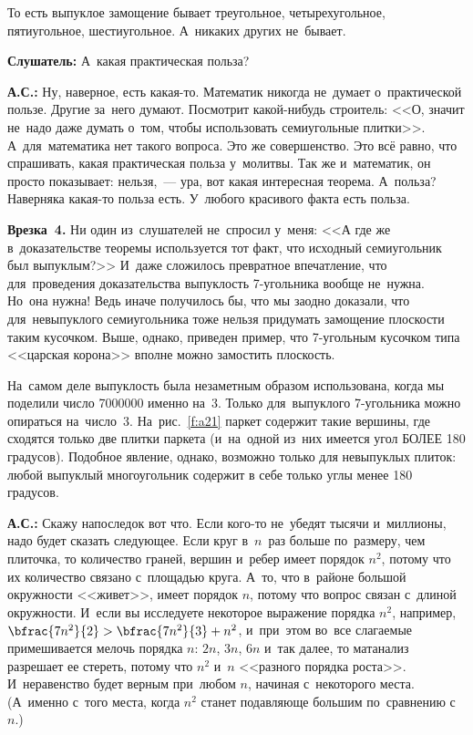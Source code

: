 {

То есть выпуклое замощение бывает треугольное, четырехугольное, пятиугольное, шестиугольное. А~никаких
других не~бывает.

}

\textbf{Слушатель:} А~какая практическая польза?

\textbf{А.С.:} Ну, наверное, есть какая-то. Математик никогда не~думает о~практической пользе.
Другие за~него думают. Посмотрит какой-нибудь строитель: <<О, значит не~надо даже думать о~том,
чтобы использовать семиугольные плитки>>. А~для~математика нет такого вопроса. Это же совершенство.
Это всё равно, что спрашивать, какая практическая польза у~молитвы. Так же и~математик, он просто
показывает: нельзя,~--- ура, вот какая интересная теорема. А~польза? Наверняка какая-то польза
есть. У~любого красивого факта есть польза.

\medskip

\hrulefill

\smallskip

\textbf{Врезка~4.} Ни один из~слушателей не~спросил у~меня: <<А где же в~доказательстве теоремы
используется тот факт, что исходный семиугольник был выпуклым?>> И~даже сложилось превратное
впечатление, что для~проведения доказательства выпуклость 7-угольника вообще не~нужна. Но~она
нужна! Ведь иначе получилось бы, что мы заодно доказали, что для~невыпуклого семиугольника тоже
нельзя придумать замощение плоскости таким кусочком. Выше, однако, приведен пример, что 7-угольным
кусочком типа <<царская корона>> вполне можно замостить плоскость.

{

На~самом деле выпуклость была незаметным образом использована, когда мы поделили число 7000000
именно на~3. Только для~выпуклого 7-угольника можно опираться на~число~3. На~рис.~\ref{f:a21} паркет
содержит такие вершины, где сходятся только две плитки паркета (и~на~одной из~них имеется угол БОЛЕЕ 180
градусов).
Подобное явление, однако, возможно только для невыпуклых плиток: любой выпуклый многоугольник содержит в себе только углы менее 180 градусов.


}

\smallskip

\hrulefill

\medskip

\textbf{А.С.:} Скажу напоследок вот что. Если кого-то не~убедят тысячи и~миллионы, надо будет сказать следующее.
Если круг в~$n$~раз больше по~размеру, чем плиточка, то количество граней, вершин и~ребер
имеет порядок $n^{2}$, потому что их количество связано с~площадью круга. А~то, что в~районе большой окружности
<<живет>>, имеет порядок $n$, потому что вопрос связан с~длиной окружности. И~если вы исследуете
некоторое выражение порядка $n^{2}$, например, $\bfrac{7n^{2}}{2}>\bfrac{7n^{2}}{3}+n^{2}$, и~при~этом во~все слагаемые
примешивается мелочь порядка $n$: $2n$, $3n$, $6n$ и~так далее, то матанализ разрешает ее стереть, потому что
$n^{2}$ и~$n$ <<разного порядка роста>>.
 И~неравенство будет верным при~любом $n$, начиная с~некоторого
места. (А~именно с~того места, когда $n^{2}$ станет подавляюще большим по~сравнению с~$n$.)


